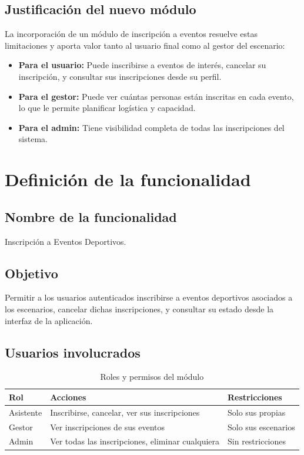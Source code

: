 \documentclass[12pt,letterpaper]{article}
\begin{document}
\subsection{Justificaci\'on del nuevo m\'odulo}

La incorporaci\'on de un m\'odulo de inscripci\'on a eventos resuelve
estas limitaciones y aporta valor tanto al usuario final como al
gestor del escenario:

\begin{itemize}
  \item \textbf{Para el usuario:} Puede inscribirse a eventos de
    inter\'es, cancelar su inscripci\'on, y consultar sus inscripciones
    desde su perfil.
  \item \textbf{Para el gestor:} Puede ver cu\'antas personas est\'an
    inscritas en cada evento, lo que le permite planificar
    log\'istica y capacidad.
  \item \textbf{Para el admin:} Tiene visibilidad completa de todas las
    inscripciones del sistema.
\end{itemize}

\section{Definici\'on de la funcionalidad}

\subsection{Nombre de la funcionalidad}

Inscripci\'on a Eventos Deportivos.

\subsection{Objetivo}

Permitir a los usuarios autenticados inscribirse a eventos deportivos
asociados a los escenarios, cancelar dichas inscripciones, y consultar
su estado desde la interfaz de la aplicaci\'on.

\subsection{Usuarios involucrados}

\begin{table}[H]
\centering
\begin{tabular}{@{}lll@{}}
\toprule
\textbf{Rol} & \textbf{Acciones} & \textbf{Restricciones} \\
\midrule
Asistente & Inscribirse, cancelar, ver sus inscripciones & Solo sus propias \\
Gestor & Ver inscripciones de sus eventos & Solo sus escenarios \\
Admin & Ver todas las inscripciones, eliminar cualquiera & Sin restricciones \\
\bottomrule
\end{tabular}
\caption{Roles y permisos del m\'odulo}
\end{table}
\end{document}
